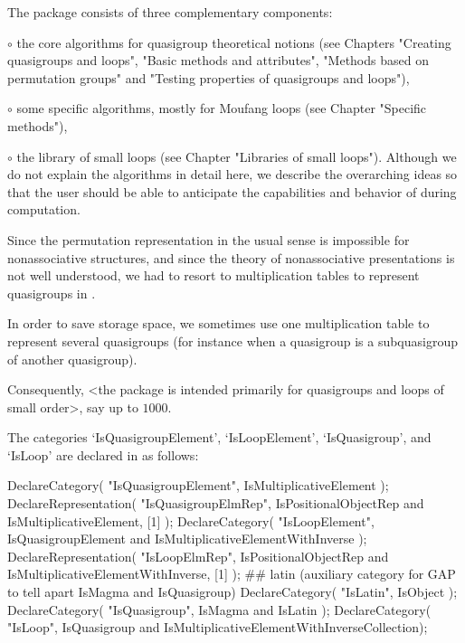 
The package consists of three complementary components:
\beginlist%
\item{$\circ$} the core algorithms for quasigroup theoretical notions
    (see Chapters "Creating quasigroups and loops",
    "Basic methods and attributes",
    "Methods based on permutation groups" and
    "Testing properties of quasigroups and loops"),
\item{$\circ$} some specific algorithms, mostly for Moufang loops
    (see Chapter "Specific methods"),
\item{$\circ$} the library of small loops (see Chapter
    "Libraries of small loops").
\endlist
Although we do not explain the algorithms in detail here, we describe the
overarching ideas so that the user should be able to anticipate the
capabilities and behavior of {\LOOPS} during computation.


Since the permutation representation in the usual sense is impossible for
nonassociative structures, and since the theory of nonassociative presentations
is not well understood, we had to resort to multiplication tables to represent
quasigroups in {\GAP}.

In order to save storage space, we sometimes use one multiplication table to
represent several quasigroups (for instance when a quasigroup is a
subquasigroup of another quasigroup).

Consequently, <the package is intended primarily for quasigroups and loops of
small order>, say up to $1000$.

The categories `IsQuasigroupElement', `IsLoopElement', `IsQuasigroup', and
`IsLoop' are declared in {\LOOPS} as follows:

\begintt
DeclareCategory( "IsQuasigroupElement", IsMultiplicativeElement );
DeclareRepresentation( "IsQuasigroupElmRep",
    IsPositionalObjectRep and IsMultiplicativeElement, [1] );
DeclareCategory( "IsLoopElement",
    IsQuasigroupElement and IsMultiplicativeElementWithInverse );
DeclareRepresentation( "IsLoopElmRep",
    IsPositionalObjectRep and IsMultiplicativeElementWithInverse, [1] );
## latin (auxiliary category for GAP to tell apart IsMagma and IsQuasigroup)
DeclareCategory( "IsLatin", IsObject );
DeclareCategory( "IsQuasigroup", IsMagma and IsLatin );
DeclareCategory( "IsLoop", IsQuasigroup and
    IsMultiplicativeElementWithInverseCollection);
\endtt

